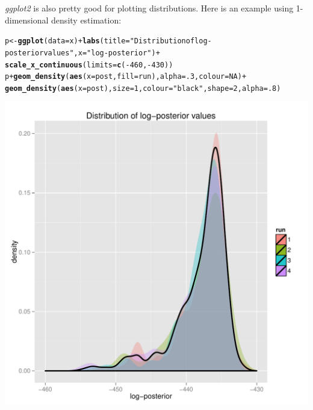 \documentclass{article}\usepackage[]{graphicx}\usepackage[]{color}
\makeatletter
\newcommand{\hlnum}[1]{\textcolor[rgb]{0.686,0.059,0.569}{#1}}%
\newcommand{\hlstr}[1]{\textcolor[rgb]{0.192,0.494,0.8}{#1}}%
\newcommand{\hlopt}[1]{\textcolor[rgb]{0,0,0}{#1}}%
\newcommand{\hlstd}[1]{\textcolor[rgb]{0.345,0.345,0.345}{#1}}%
\newcommand{\hlkwb}[1]{\textcolor[rgb]{0.69,0.353,0.396}{#1}}%
\newcommand{\hlkwc}[1]{\textcolor[rgb]{0.333,0.667,0.333}{#1}}%
\newcommand{\hlkwd}[1]{\textcolor[rgb]{0.737,0.353,0.396}{\textbf{#1}}}%
\newenvironment{kframe}{%
 \def\at@end@of@kframe{}%
 \ifinner\ifhmode%
  \def\at@end@of@kframe{\end{minipage}}%
  \begin{minipage}{\columnwidth}%
 \fi\fi%
 \def\FrameCommand##1{\hskip\@totalleftmargin \hskip-\fboxsep
 \colorbox{shadecolor}{##1}\hskip-\fboxsep
     \hskip-\linewidth \hskip-\@totalleftmargin \hskip\columnwidth}%
 \MakeFramed {\advance\hsize-\width
   \@totalleftmargin\z@ \linewidth\hsize
   \@setminipage}}%
 {\par\unskip\endMakeFramed%
 \at@end@of@kframe}
\newenvironment{knitrout}{}{} %
\makeatother
\begin{document}
\textit{ggplot2} is also pretty good for plotting distributions.
Here is an example using 1-dimensional density estimation:
\begin{knitrout}
\color{fgcolor}\begin{kframe}
\begin{alltt}
\hlstd{p} \hlkwb{<-} \hlkwd{ggplot}\hlstd{(}\hlkwc{data}\hlstd{=x)} \hlopt{+} \hlkwd{labs}\hlstd{(}\hlkwc{title}\hlstd{=}\hlstr{"Distribution of log-posterior values"}\hlstd{,} \hlkwc{x}\hlstd{=}\hlstr{"log-posterior"}\hlstd{)} \hlopt{+}
    \hlkwd{scale_x_continuous}\hlstd{(}\hlkwc{limits}\hlstd{=}\hlkwd{c}\hlstd{(}\hlopt{-}\hlnum{460}\hlstd{,}\hlopt{-}\hlnum{430}\hlstd{))}
\hlstd{p} \hlopt{+} \hlkwd{geom_density}\hlstd{(}\hlkwd{aes}\hlstd{(}\hlkwc{x}\hlstd{=post,} \hlkwc{fill}\hlstd{=run),} \hlkwc{alpha}\hlstd{=}\hlnum{.3}\hlstd{,} \hlkwc{colour}\hlstd{=}\hlnum{NA}\hlstd{)} \hlopt{+}
    \hlkwd{geom_density}\hlstd{(}\hlkwd{aes}\hlstd{(}\hlkwc{x}\hlstd{=post),} \hlkwc{size}\hlstd{=}\hlnum{1}\hlstd{,} \hlkwc{colour}\hlstd{=}\hlstr{"black"}\hlstd{,} \hlkwc{shape}\hlstd{=}\hlnum{2}\hlstd{,} \hlkwc{alpha}\hlstd{=}\hlnum{.8}\hlstd{)}
\end{alltt}
\end{kframe}

{\centering \includegraphics[width=.6\textwidth]{figs/unnamed-chunk-17} 

}



\end{knitrout}
\end{document}
